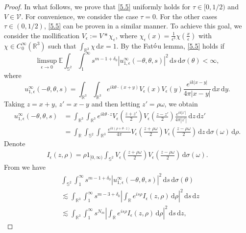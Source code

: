 \documentclass[reqno, 12pt]{amsart}
\numberwithin{equation}{section}
\begin{document}
\begin{proof}
In what follows, we prove that \eqref{5.5} uniformly holds for $\tau \in [0,1/2)$ and $V \in\mathcal V$. For convenience, we consider the case $\tau=0$. For the other cases $\tau \in (0,1/2)$, \eqref{5.5} can be proven in a similar manner.
To achieve this goal, we consider the mollification $V_\epsilon := V * \chi_\epsilon$, where $\chi_\epsilon(x)=\frac{1}{\epsilon^3}\chi(\frac{x}{\epsilon})$ with $\chi \in C_0^\infty(\mathbb{R}^3)$ such that $\int_{\mathbb{R}^3} \chi \,\mathrm{d}x=1$. By the Fat$\acute{\rm o}$u lemma, \eqref{5.5} holds if \begin{equation}\label{eq5.6}
	\limsup_{\epsilon \to 0} \mathbb E \int_{\mathbb{S}^2}\int_1^\infty s^{m-1+\delta_0}|u^\infty_{1, \epsilon}(-\theta,\theta,s)|^2\,\mathrm{d}s\,\mathrm{d}\sigma(\theta) < \infty,
\end{equation}  where \[
u^\infty_{1, \epsilon}(-\theta,\theta,s)=\int_{\mathbb{R}^3}\int_{\mathbb{R}^3} e^{ik\theta\cdot(x+y)} V_\epsilon(x) V_\epsilon(y)\frac{e^{ik|x-y|}}{4\pi|x-y|}\,\mathrm{d}x\,\mathrm{d}y.
\] Taking $z=x+y$, $z'=x-y$ and then letting $z'=\rho \omega$, we obtain \begin{align*}
	u^\infty_{1, \epsilon}(-\theta,\theta,s) &= \int_{\mathbb{R}^3}\int_{\mathbb{R}^3}e^{ik\theta \cdot z}V_\epsilon\left(\frac{z+z'}{2}\right)V_\epsilon\left(\frac{z-z'}{2}\right)\frac{e^
		{ik|z'|}}{4\pi|z'|}\,\mathrm{d}z\,\mathrm{d}z'\\ &=\int_{\mathbb{R}}\int_{\mathbb{S}^2}\int_{\mathbb{R}^3}\frac{e^
		{ik(\rho+\theta \cdot z)}}{4\pi}V_\epsilon\left(\frac{z+\rho \omega}{2}\right)V_\epsilon\left(\frac{z-\rho\omega}{2}\right)\,\mathrm{d}z\,\mathrm{d}\sigma(\omega)\,\mathrm{d}\rho.
\end{align*} Denote \begin{align*}
	I_\epsilon(z,\rho)=\rho 1_{[0,\infty)}\int_{\mathbb{S}^2}V_\epsilon\left(\frac{z+\rho \omega}{2}\right)V_\epsilon\left(\frac{z-\rho\omega}{2}\right)\,\mathrm{d}\sigma(\omega).
\end{align*} From \cite[Lemma 4.7]{Caro} we have \begin{align*}
	&\int_{\mathbb{S}^2}\int_1^\infty s^{m-1+\delta_0} |u^\infty_{1, \epsilon}(-\theta,\theta,s)|^2\,\mathrm{d}s\,\mathrm{d}\sigma(\theta) \\ &\lesssim \int_{\mathbb R^3}\int_1^\infty s^{m-3+\delta_0} \left| \int_{\mathbb R} e^{is\rho} I_\epsilon(z,\rho)\,\mathrm{d}\rho\right|^2\,\mathrm{d}s\,\mathrm{d}z \\ &\lesssim \int_{\mathbb R^3}\int_1^\infty  s^{ N_m}\left| \int_{\mathbb R} e^{is\rho} I_\epsilon(z,\rho)\,\mathrm{d}\rho\right|^2\,\mathrm{d}s\,\mathrm{d}z,

\end{align*}
\end{proof}
\end{document}

